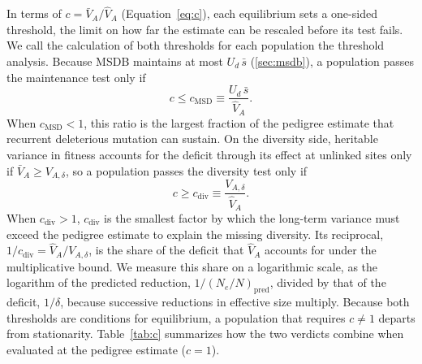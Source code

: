 \documentclass{article}
\begin{document}
In terms of $c = \bar{V}_A/\hat{V}_A$ (Equation~\eqref{eq:c}), each equilibrium sets a one-sided threshold, the limit on how far the estimate can be rescaled before its test fails. We call the calculation of both thresholds for each population the threshold analysis. Because MSDB maintains at most $U_d\,\bar{s}$ (\autoref{sec:msdb}), a population passes the maintenance test only if
\begin{equation}
    c \le c_\text{MSD} \equiv \frac{U_d\,\bar{s}}{\hat{V}_A}.
\end{equation}
When $c_\text{MSD} < 1$, this ratio is the largest fraction of the pedigree estimate that recurrent deleterious mutation can sustain. On the diversity side, heritable variance in fitness accounts for the deficit through its effect at unlinked sites only if $\bar{V}_A \ge V_{A,\delta}$, so a population passes the diversity test only if
\begin{equation}
    c \ge c_\text{div} \equiv \frac{V_{A,\delta}}{\hat{V}_A}.
\end{equation}
When $c_\text{div} > 1$, $c_\text{div}$ is the smallest factor by which the long-term variance must exceed the pedigree estimate to explain the missing diversity. Its reciprocal, $1/c_\text{div} = \hat{V}_A/V_{A,\delta}$, is the share of the deficit that $\hat{V}_A$ accounts for under the multiplicative bound. We measure this share on a logarithmic scale, as the logarithm of the predicted reduction, $1/(N_e/N)_\text{pred}$, divided by that of the deficit, $1/\delta$, because successive reductions in effective size multiply. Because both thresholds are conditions for equilibrium, a population that requires $c \ne 1$ departs from stationarity. Table~\ref{tab:c} summarizes how the two verdicts combine when evaluated at the pedigree estimate ($c = 1$).
\end{document}
